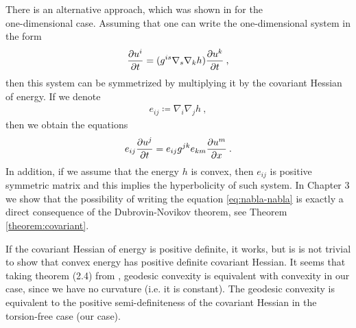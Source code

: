 There is an alternative approach, which was shown in \cite{Pavelka} for the \\one-dimensional case. Assuming that one can write the one-dimensional system in the form
\begin{align}
    \frac{\partial u^i}{\partial t} = (g^{is} \nabla_s \nabla_k h) \frac{\partial u^k}{\partial t} \:, \label{eq:nabla-nabla}
\end{align}
then this system can be symmetrized by multiplying it by the covariant Hessian of energy. If we denote
\begin{align}
    e_{ij} \coloneqq \nabla_i \nabla_j h \:,
\end{align}
then we obtain the equations
\begin{align}
    e_{ij} \frac{\partial u^j}{\partial t} = e_{ij} g^{jk} e_{km} \frac{\partial u^m}{\partial x} \:.
\end{align}
In addition, if we assume that the energy $h$ is convex, then $e_{ij}$ is positive symmetric matrix and this implies the hyperbolicity of such system. In Chapter 3 we show that the possibility of writing the equation \eqref{eq:nabla-nabla} is exactly a direct consequence of the Dubrovin-Novikov theorem, see Theorem \vref{theorem:covariant}. 

If the covariant Hessian of energy is positive definite, it works, but is is not trivial to show
that convex energy has positive definite covariant Hessian. It seems that taking theorem (2.4) from \cite{Rapcsak}, geodesic convexity is equivalent with convexity in our case, since we have no curvature (i.e. it is constant). The geodesic convexity is equivalent to the positive semi-definiteness of the covariant Hessian in the torsion-free case (our case). 